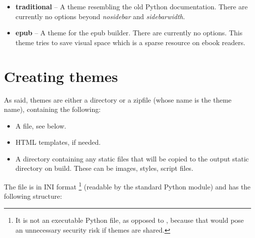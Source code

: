 \documentclass[letterpaper,10pt,english]{sphinxmanual}
\begin{document}
\begin{itemize}
\begin{itemize}
\end{itemize}

\item {} 
\textbf{traditional} -- A theme resembling the old Python documentation.  There are
currently no options beyond \emph{nosidebar} and \emph{sidebarwidth}.

\item {} 
\textbf{epub} -- A theme for the epub builder.  There are currently no options.
This theme tries to save visual space which is a sparse resource on ebook
readers.

\end{itemize}


\section{Creating themes}
\label{theming:creating-themes}
As said, themes are either a directory or a zipfile (whose name is the theme
name), containing the following:
\begin{itemize}
\item {} 
A  file, see below.

\item {} 
HTML templates, if needed.

\item {} 
A  directory containing any static files that will be copied to the
output static directory on build.  These can be images, styles, script files.

\end{itemize}

The  file is in INI format \footnote[1]{\sphinxAtStartFootnote%
It is not an executable Python file, as opposed to ,
because that would pose an unnecessary security risk if themes are
shared.
} (readable by the standard
Python  module) and has the following structure:
\end{document}
